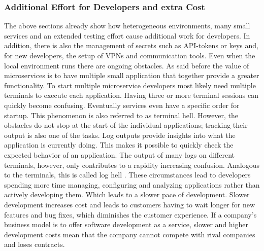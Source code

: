 \documentclass[12pt, a4paper]{article}
\begin{document}
        \subsubsection{Additional Effort for Developers and extra Cost}
        The above sections already show how heterogeneous environments, many small services and an extended testing effort cause additional work for developers. In addition, there is also the management of secrets such as API-tokens or keys and, for new developers, the setup of \ac{VPN}s and communication tools. Even when the local environment runs there are ongoing obstacles. As said before the value of microservices is to have multiple small application that together provide a greater functionality. To start multiple microservice developers most likely need multiple terminals to execute each application. Having three or more terminal sessions can quickly become confusing. Eventually services even have a specific order for startup. This phenomenon is also referred to as terminal hell. However, the obstacles do not stop at the start of the individual applications; tracking their output is also one of the tasks. Log outputs provide insights into what the application is currently doing. This makes it possible to quickly check the expected behavior of an application. The output of many logs on different terminals, however, only contributes to a rapidity increasing confusion. Analogous to the terminals, this is called log hell \cite{micro}.\newline
        These circumstances lead to developers spending more time managing, configuring and analyzing applications rather than actively developing them. Which leads to a slower pace of development. Slower development increases cost and leads to customers having to wait longer for new features and bug fixes, which diminishes the customer experience. If a company's business model is to offer software development as a service, slower and higher development costs mean that the company cannot compete with rival companies and loses contracts.
\end{document}
